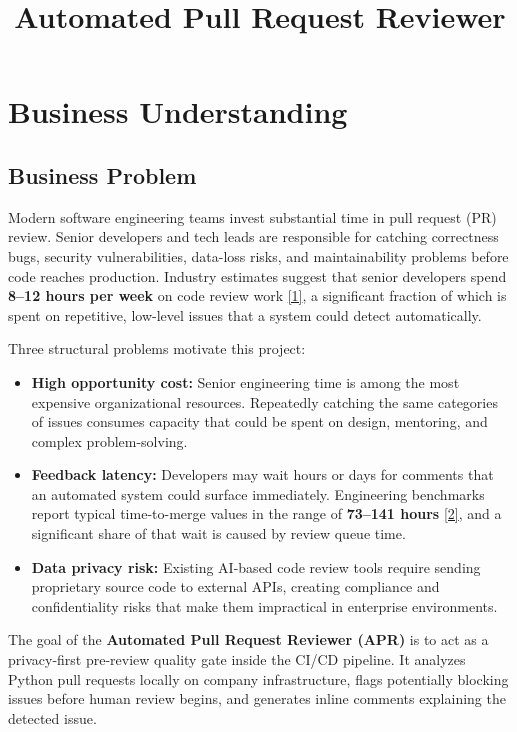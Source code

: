 \documentclass[11pt]{article}
\title{Automated Pull Request Reviewer}
\begin{document}
\maketitle
\thispagestyle{empty}

\section*{Business Understanding}

\subsection*{Business Problem}

Modern software engineering teams invest substantial time in pull request (PR) review. Senior developers and tech leads are responsible for catching correctness bugs, security vulnerabilities, data-loss risks, and maintainability problems before code reaches production. Industry estimates suggest that senior developers spend \textbf{8--12 hours per week} on code review work \href{https://dev.to/sociilabs/the-40k-code-review-tax-why-manual-reviews-are-bleeding-your-engineering-budget-3485}{[1]}, a significant fraction of which is spent on repetitive, low-level issues that a system could detect automatically.

Three structural problems motivate this project:

\begin{itemize}
    \item \textbf{High opportunity cost:} Senior engineering time is among the most expensive organizational resources. Repeatedly catching the same categories of issues consumes capacity that could be spent on design, mentoring, and complex problem-solving.
    \item \textbf{Feedback latency:} Developers may wait hours or days for comments that an automated system could surface immediately. Engineering benchmarks report typical time-to-merge values in the range of \textbf{73--141 hours} \href{https://linearb.io/resources/software-engineering-benchmarks-report}{[2]}, and a significant share of that wait is caused by review queue time.
    \item \textbf{Data privacy risk:} Existing AI-based code review tools require sending proprietary source code to external APIs, creating compliance and confidentiality risks that make them impractical in enterprise environments.
\end{itemize}

The goal of the \textbf{Automated Pull Request Reviewer (APR)} is to act as a privacy-first pre-review quality gate inside the CI/CD pipeline. It analyzes Python pull requests locally on company infrastructure, flags potentially blocking issues before human review begins, and generates inline comments explaining the detected issue.
\end{document}
